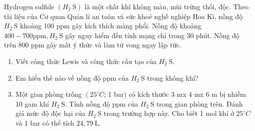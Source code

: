 \begin{bt} Hydrogen sulfide $\left(H_2\mathrm{~S}\right)$ là một chất khí không màu, mùi trứng thối, độc. Theo tài liệu của Cơ quan Quản lí an toàn và sức khoẻ nghề nghiệp Hoa Kì, nồng độ $H_2\mathrm{~S}$ khoảng 100 ppm gây kích thích màng phổi. Nồng độ khoảng $400-700\mathrm{ppm}, H_2\mathrm{~S}$ gây nguy hiểm đến tính mạng chỉ trong 30 phút. Nồng độ trên 800 ppm gây mất ý thức và làm tử vong ngay lập tức.
	\begin{enumerate}
		\item Viết công thức Lewis và công thức cấu tạo của $H_2\mathrm{~S}$.
		\item Em hiểu thế nào về nồng độ ppm của $H_2\mathrm{~S}$ trong không khí?
		\item Một gian phòng trống $\left(25^{\circ} C\right.$; 1 bar) có kích thước 3 mx 4 mx 6 m bị nhiễm 10 gam khí $H_2\mathrm{~S}$. Tính nồng độ ppm của $H_2\mathrm{~S}$ trong gian phòng trên. Đánh giá mức độ độc hại của $H_2\mathrm{~S}$ trong trường hợp này. Cho biết 1 mol khí ở $25^{\circ} C$ và 1 bar có thể tích $24,79\mathrm{~L}$.
	\end{enumerate}
\end{bt}
